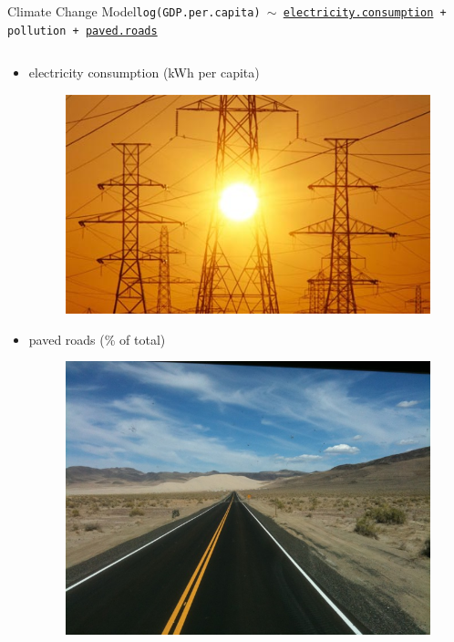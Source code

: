 \documentclass{beamer}
\begin{document}
\begin{frame}{{\sc Climate Change} Model}{\tt log(GDP.per.capita) $\sim$ \href{http://data.worldbank.org/indicator/EG.USE.ELEC.KH.PC}{electricity.consumption} + pollution + \href{http://data.worldbank.org/indicator/IS.ROD.PAVE.ZS}{paved.roads}}
  \begin{columns}
    \begin{column}{0.5\textwidth}
      \begin{itemize}
      \item electricity consumption (kWh per capita)
        \begin{figure}
	  \centering
	  \includegraphics[scale=0.25]{images/electricity_consumption.jpg}
        \end{figure}
      \item paved roads (\% of total)
        \begin{figure}
	  \centering
	  \includegraphics[scale=0.15]{images/paved_road.jpg}
        \end{figure}
      \end{itemize}
    \end{column}
    

\end{columns}
\end{frame}
\end{document}
